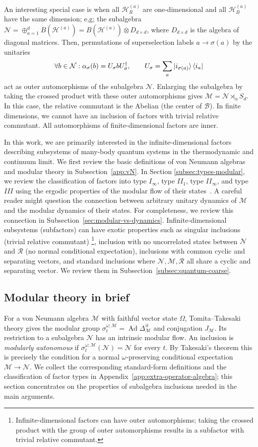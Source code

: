 \documentclass[a4paper,11pt]{article}
\theoremstyle{definition}
\newcommand{\mB}{\mathcal{B}}%
\newcommand{\mR}{\mathcal{R}}
\newcommand{\mN}{\mathcal{N}}
\newcommand{\mH}{\mathcal{H}}
\newcommand{\mM}{\mathcal{M}}
\begin{document}
An interesting special case is when all $\mH_R^{(a)}$ are one-dimensional and all $\mH_B^{(a)}$ have the same dimension; e,g; the subalgebra $\mN=\oplus_{a=1}^d B(\mH^{(a)})=B(\mH^{(a)})\otimes D_{d\times d}$, where $D_{d\times d}$ is the algebra of diagonal matrices. Then, permutations of superselection labels $a\to \sigma(a)$ by the unitaries
 \begin{align}
    \forall b\in\mN: \alpha_\sigma(b)=U_\sigma b U_\sigma^\dagger,\qquad U_{\sigma}=\sum_a \ket{i_{\sigma(a)}}\bra{i_a}
 \end{align}
act as outer automorphisms of the subalgebra $\mN$.
Enlarging the subalgebra by taking the crossed product with these outer automorphisms gives $\mM=\mN\rtimes_\alpha S_d$. In this case, the relative commutant is the Abelian (the center of $\mB$). In finite dimensions, we cannot have an inclusion of factors with trivial relative commutant. All automorphisms of finite-dimensional factors are inner.


In this work, we are primarily interested in the infinite-dimensional factors describing subsystems of many-body quantum systems in the thermodynamic and continuum limit. We first review the basic definitions of von Neumann algebras and modular theory in Subsection~\ref{app:vN}. In Section \ref{subsec:types-modular}, we review the classification of factors into type $I_\infty$, type $II_1$, type $II_\infty$, and type $III$ using the ergodic properties of the modular flow of their states~\cite{Takesaki1970,Connes1973}. A careful reader might question the connection between arbitrary unitary dynamics of $\mM$ and the modular dynamics of their states. For completeness, we review this connection in  Subsection~\ref{sec:modular-vs-dynamics}. Infinite-dimensional subsystems (subfactors) can have exotic properties such as singular inclusions (trivial relative commutant) \footnote{Infinite-dimensional factors can have outer automorphisms; taking the crossed product with the group of outer automorphisms results in a subfactor with trivial relative commutant.}, inclusion with no uncorrelated states between $\mN$ and $\mR$ (no normal conditional expectation), inclusions with common cyclic and separating vectors, and standard inclusions where $\mN,\mM,\mR$ all share a cyclic and separating vector. We review them in Subsection~\ref{subsec:quantum-coarse}.

\subsection{Modular theory in brief}
For a von Neumann algebra $\mM$ with faithful vector state $\Omega$, Tomita--Takesaki theory gives the modular group $\sigma_t^{\omega;\mM}=\operatorname{Ad}\Delta_{\mM}^{it}$ and conjugation $J_{\mM}$. Its restriction to a subalgebra $\mN$ has an intrinsic modular flow. An inclusion is \emph{modularly autonomous} if $\sigma_t^{\omega;\mM}(\mN)=\mN$ for every $t$. By Takesaki's theorem this is precisely the condition for a normal $\omega$-preserving conditional expectation $\mM\to\mN$. We collect the corresponding standard-form definitions and the classification of factor types in Appendix~\ref{app:extra-operator-algebra}; this section concentrates on the properties of subalgebra inclusions needed in the main arguments.
\end{document}
